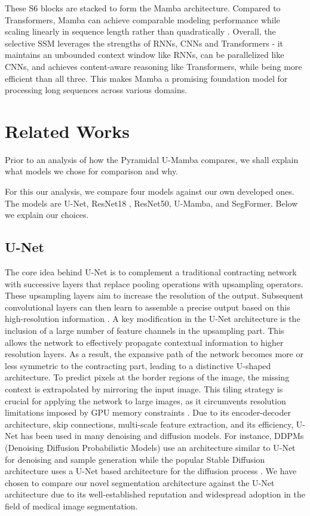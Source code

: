 \documentclass[conference]{IEEEtran}
\begin{document}
These S6 blocks are stacked to form the Mamba architecture. Compared to Transformers, Mamba can achieve comparable modeling performance while scaling linearly in sequence length rather than quadratically \cite{gu2023mamba}. Overall, the selective SSM leverages the strengths of RNNs, CNNs and Transformers - it maintains an unbounded context window like RNNs, can be parallelized like CNNs, and achieves content-aware reasoning like Transformers, while being more efficient than all three. This makes Mamba a promising foundation model for processing long sequences across various domains.


\section{Related Works}
Prior to an analysis of how the Pyramidal U-Mamba compares, we shall explain what models we chose for comparison and why.

For this our analysis, we compare four models against our own developed ones. The models are U-Net\cite{ronneberger2015unet}, ResNet18 \cite{he2016deep}, ResNet50, U-Mamba\cite{U-Mamba}, and SegFormer\cite{xie2021segformer}. Below we explain our choices.
\subsection{U-Net}
The core idea behind U-Net is to complement a traditional contracting network with successive layers that replace pooling operations with upsampling operators. These upsampling layers aim to increase the resolution of the output. Subsequent convolutional layers can then learn to assemble a precise output based on this high-resolution information \cite{ronneberger2015unet}.
A key modification in the U-Net architecture is the inclusion of a large number of feature channels in the upsampling part. This allows the network to effectively propagate contextual information to higher resolution layers. As a result, the expansive path of the network becomes more or less symmetric to the contracting part, leading to a distinctive U-shaped architecture. To predict pixels at the border regions of the image, the missing context is extrapolated by mirroring the input image. This tiling strategy is crucial for applying the network to large images, as it circumvents resolution limitations imposed by GPU memory constraints \cite{ronneberger2015unet}. Due to its encoder-decoder architecture, skip connections, multi-scale feature extraction, and its efficiency, U-Net has been used in many denoising and diffusion models. For instance, DDPMs (Denoising Diffusion Probabilistic Models) use an architecture similar to U-Net for denoising and sample generation \cite{DBLP:journals/corr/abs-2006-11239} while the popular Stable Diffusion architecture uses a U-Net based architecture for the diffusion process \cite{rombach2021highresolution}. We have chosen to compare our novel segmentation architecture against the U-Net architecture due to its well-established reputation and widespread adoption in the field of medical image segmentation.
\end{document}
